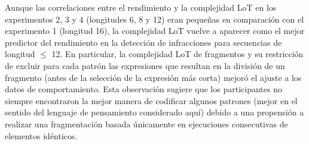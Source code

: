 
Aunque las correlaciones entre el rendimiento y la complejidad LoT en los experimentos 2, 3 y 4 (longitudes 6, 8 y 12) eran pequeñas en comparación con el experimento 1 (longitud 16), la complejidad LoT vuelve a aparecer como el mejor predictor del rendimiento en la detección de infracciones para secuencias de longitud $\leq$ 12. En particular, la complejidad LoT de fragmentos y su restricción de excluir para cada patrón las expresiones que resultan en la división de un fragmento (antes de la selección de la expresión más corta) mejoró el ajuste a los datos de comportamiento. Esta observación sugiere que los participantes no siempre encontraron la mejor manera de codificar algunos patrones (mejor en el sentido del lenguaje de pensamiento considerado aquí) debido a una propensión a realizar una fragmentación basada únicamente en ejecuciones consecutivas de elementos idénticos.


